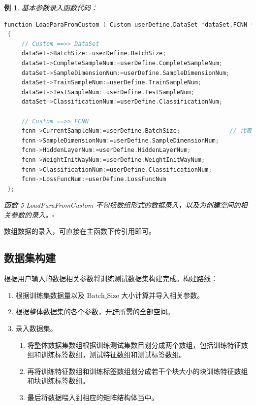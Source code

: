 \documentclass[UTF-8]{progbookcn}
\newtheorem{example}{例}[chapter]         %
\begin{document}
\begin{example}
基本参数录入函数代码：
\begin{lstlisting}[language=C,caption={函数 5 LoadParaFromCustom}]
function LoadParaFromCustom ( Custom userDefine,DataSet *dataSet,FCNN *fcnn )
 {
     // Custom ==>> DataSet
     dataSet->BatchSize:=userDefine.BatchSize;
     dataSet->CompleteSampleNum:=userDefine.CompleteSampleNum;
     dataSet->SampleDimensionNum:=userDefine.SampleDimensionNum;
     dataSet->TrainSampleNum:=userDefine.TrainSampleNum;
     dataSet->TestSampleNum:=userDefine.TestSampleNum;
     dataSet->ClassificationNum:=userDefine.ClassificationNum;

     // Custom ==>> FCNN
     fcnn->CurrentSampleNum:=userDefine.BatchSize;              // 代表当前神经网络前向传播时的数据样本的个数
     fcnn->SampleDimensionNum:=userDefine.SampleDimensionNum;
     fcnn->HiddenLayerNum:=userDefine.HiddenLayerNum;
     fcnn->WeightInitWayNum:=userDefine.WeightInitWayNum;
     fcnn->ClassificationNum:=userDefine.ClassificationNum;
     fcnn->LossFuncNum:=userDefine.LossFuncNum
 };
\end{lstlisting}
函数 5 {\setsansfont{Myriad Pro}LoadParaFromCustom} 不包括数组形式的数据录入，以及为创建空间的相关参数的录入。\hfill$\square$
\end{example}

\begin{information}
数组数据的录入，可直接在主函数下传引用即可。
\end{information}

\subsection{数据集构建}

\begin{keypoint}
根据用户输入的数据相关参数将训练测试数据集构建完成。构建路线：
\begin{enumerate}
  \item 根据训练集数据量以及 $\text{Batch\_Size}$ 大小计算并导入相关参数。
  \item 根据整体数据集的各个参数，开辟所需的全部空间。
  \item 录入数据集。
  \begin{enumerate}
  \item 将整体数据集数组根据训练测试集数目划分成两个数组，包括训练特征数组和训练标签数组，测试特征数组和测试标签数组。
  \item 再将训练特征数组和训练标签数组划分成若干个块大小的块训练特征数组和块训练标签数组。
  \item 最后将数据喂入到相应的矩阵结构体当中。
  \end{enumerate}

\end{enumerate}
\end{keypoint}
\end{document}
